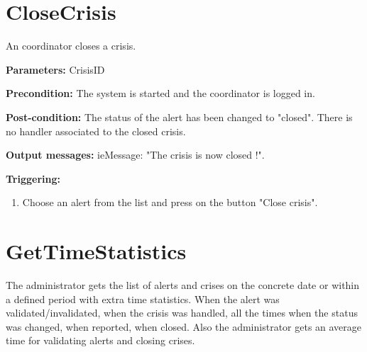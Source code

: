 \section{CloseCrisis}
\label{operation:CloseCrisis}

An coordinator closes a crisis.

\begin{description}
	\item \textbf{Parameters:} CrisisID
	\item \textbf{Precondition:} The system is started and the coordinator is
	logged in.
	\item \textbf{Post-condition:} The status of the alert has been changed to
	"closed". There is no handler associated to the closed crisis.
	\item \textbf{Output messages:} ieMessage: "The crisis is now closed !".
	
	\item \textbf{Triggering:}
	
	\begin{enumerate}
		\item Choose an alert from the list and press on the button "Close crisis".
	\end{enumerate}
\end{description}

\section{GetTimeStatistics}
\label{operation:GetTimeStatistics}

The administrator gets the list of alerts and crises on the concrete date or
within a defined period with extra time statistics.
When the alert was validated/invalidated, when the crisis was handled, all the
times when the status was changed, when reported, when closed.
Also the administrator gets an average time for validating alerts and closing crises.


